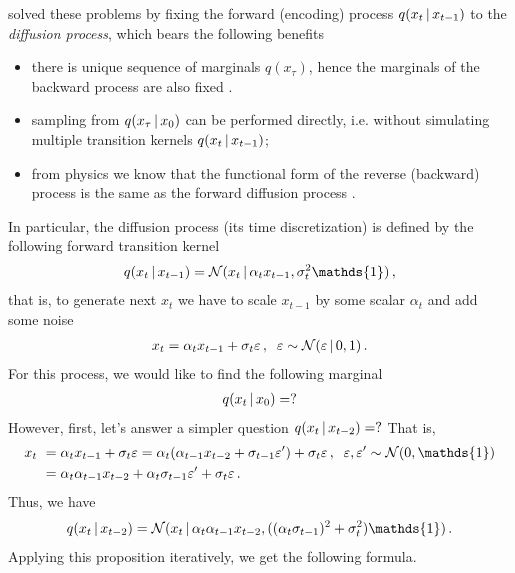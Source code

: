 \cite{sohl2015deep} solved these problems by fixing the forward (encoding) process $q(x_t\,|\, x_{t-1})$ to the \textit{diffusion process}, which bears the following benefits
\begin{itemize}[label={}]
    \item \yes there is unique sequence of marginals $q(x_\tau)$, hence the marginals of the backward process are also fixed .
    \item \yes sampling from $q(x_\tau \,|\, x_0)$ can be performed directly, i.e. without simulating multiple transition kernels $q(x_t\,|\, x_{t-1})$;
    \item \yes from physics we know that the functional form of the reverse (backward) process is the same as the forward diffusion process \citep{feller1949theory}. 
\end{itemize}
In particular, the diffusion process (its time discretization) is defined by the following forward transition kernel
\begin{align}
    q(x_t\cond x_{t-1}) = \Normal(x_t\cond \alpha_t x_{t-1}, \sigma_t^2 \mathds{1})\,,
\end{align}
that is, to generate next $x_t$ we have to scale $x_{t-1}$ by some scalar $\alpha_t$ and add some noise
\begin{align}
    x_t = \alpha_t x_{t-1} + \sigma_t \varepsilon\,, \;\; \varepsilon \sim\mathcal{N}(\varepsilon\,|\, 0,1)\,.
\end{align}
For this process, we would like to find the following marginal
\begin{align}
    q(x_t\,|\, x_{0}) = ?
\end{align}
However, first, let's answer a simpler question $q(x_t\,|\, x_{t-2}) = ?$ That is,
\begin{align}
    x_t ~&= \alpha_t x_{t-1} + \sigma_t \eps = \alpha_t (\alpha_{t-1}x_{t-2} + \sigma_{t-1}\eps') + \sigma_t \eps\,, \;\;\eps,\eps'\sim \Normal(0,\mathds{1})\\
    ~&= \alpha_t \alpha_{t-1} x_{t-2} + \alpha_t\sigma_{t-1}\eps' + \sigma_t \eps\,.
\end{align}
Thus, we have
\begin{align}
    q(x_t\cond x_{t-2}) = \Normal(x_t\cond \alpha_t \alpha_{t-1} x_{t-2}, ((\alpha_t \sigma_{t-1})^2 + \sigma_t^2)\mathds{1})\,.
\end{align}
Applying this proposition iteratively, we get the following formula.
